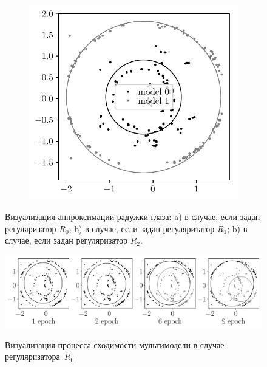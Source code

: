 \documentclass[12pt, twoside]{article}
\numberwithin{equation}{section}
\begin{document}
\begin{figure}
\begin{subfigure}[b]{0.3\textwidth}
         \caption{}
     \end{subfigure}
     \begin{subfigure}[b]{0.3\textwidth}
         \centering
         \includegraphics[width=\textwidth]{figures/prior_regular_real_example}
         \caption{}
     \end{subfigure}
     \caption{Визуализация аппроксимации радужки глаза: a) в случае, если задан регуляризатор $R_0$; b) в случае, если задан регуляризатор $R_1$; b) в случае, если задан регуляризатор $R_2$.}
    \label{ce:fig6}
\end{figure}

\begin{figure}
     \centering
     \includegraphics[width=\textwidth]{figures/experiment_real_not_prior}\\
     
     \caption{Визуализация процесса сходимости мультимодели в случае регуляризатора~$R_0$}
    \label{ce:fig7}
\end{figure}
\end{document}
